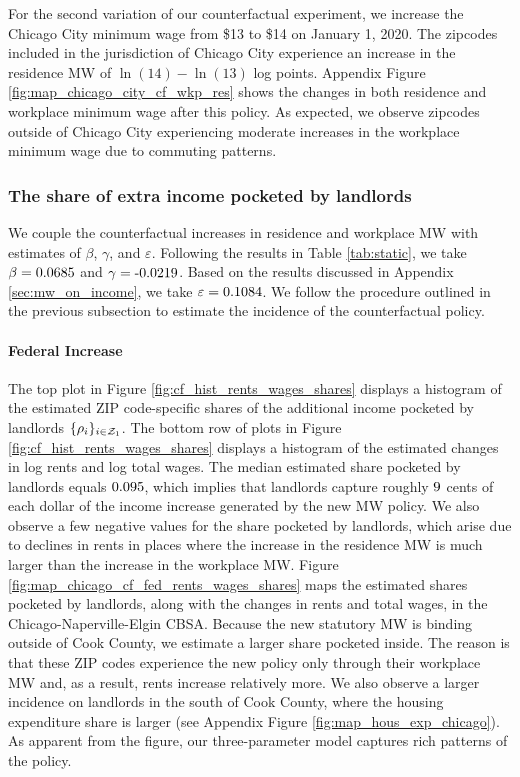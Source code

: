 For the second variation of our counterfactual experiment, we increase the
Chicago City minimum wage from \$13 to \$14 on January 1, 2020. The zipcodes 
included in the jurisdiction of Chicago City experience an increase in the 
residence MW of $\ln(14)-\ln(13)$ log points.
Appendix Figure \ref{fig:map_chicago_city_cf_wkp_res} shows the changes in both
residence and workplace minimum wage after this policy. As expected, we observe
zipcodes outside of Chicago City experiencing moderate increases in the workplace 
minimum wage due to commuting patterns. 

\subsubsection*{The share of extra income pocketed by landlords}
\label{sec:cf_rents_and_wage_changes}

We couple the counterfactual increases in residence and workplace MW with 
estimates of $\beta$, $\gamma$, and $\varepsilon$.
Following the results in Table \ref{tab:static}, we take 
$\beta = \textnormal{0.0685}$ and 
$\gamma = \textnormal{-0.0219}$.
Based on the results discussed in Appendix \ref{sec:mw_on_income}, we take
$\varepsilon = \textnormal{0.1084}$.
We follow the procedure outlined in the previous subsection to estimate the 
incidence of the counterfactual policy.

\paragraph{Federal Increase}

The top plot in Figure \ref{fig:cf_hist_rents_wages_shares} displays a histogram 
of the estimated ZIP code-specific shares of the additional income pocketed by 
landlords $\{\rho_i\}_{i\in\mathcal{Z}_1}$.
The bottom row of plots in Figure \ref{fig:cf_hist_rents_wages_shares} displays 
a histogram of the estimated changes in log rents and log total wages.
The median estimated share pocketed by landlords equals $\textnormal{0.095}$, 
which implies that landlords capture roughly $\textnormal{9}$ cents of 
each dollar of the income increase generated by the new MW policy.
We also observe a few negative values for the share pocketed by landlords, which
arise due to declines in rents in places where the increase in the residence MW
is much larger than the increase in the workplace MW.
Figure \ref{fig:map_chicago_cf_fed_rents_wages_shares} maps the estimated shares 
pocketed by landlords, along with the changes in rents and total wages, in the 
Chicago-Naperville-Elgin CBSA.
Because the new statutory MW is binding outside of Cook County, we estimate 
a larger share pocketed inside.
The reason is that these ZIP codes experience the new policy only through
their workplace MW and, as a result, rents increase relatively more.
We also observe a larger incidence on landlords in the south of Cook County,
where the housing expenditure share is larger 
(see Appendix Figure \ref{fig:map_hous_exp_chicago}).
As apparent from the figure, our three-parameter model captures rich patterns
of the policy.

